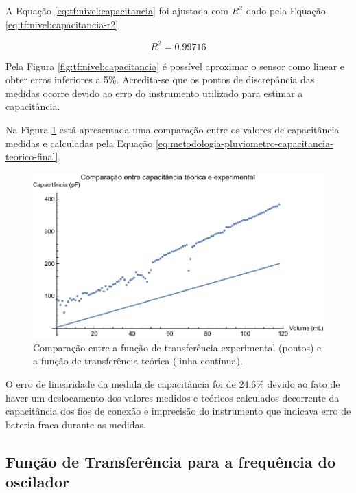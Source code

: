 \documentclass[a4paper]{instrumentacao}
\begin{document}
A Equação \ref{eq:tf:nivel:capacitancia} foi ajustada com $R^2$ dado pela Equação \ref{eq:tf:nivel:capacitancia-r2} 

\begin{equation}
	R^2 = 0.99716
	\label{eq:tf:nivel:capacitancia-r2}
\end{equation}

Pela Figura \ref{fig:tf:nivel:capacitancia} é possível aproximar o sensor como linear e obter erros inferiores a 5\%. Acredita-se que os pontos de discrepância das medidas ocorre devido ao erro do instrumento utilizado para estimar a capacitância.

Na Figura \ref{fig:resultados-pluviometro-capacitancia-comparacao} está apresentada uma comparação entre os valores de capacitância medidas e calculadas pela Equação \ref{eq:metodologia-pluviometro-capacitancia-teorico-final}.

\begin{figure}[H]
	\centering \includegraphics[width=\textwidth]{Nivel/Experimental/Capacitancia-Comparacao.pdf}
	\caption{Comparação entre a função de transferência experimental (pontos) e a função de transferência teórica (linha contínua).}
	\label{fig:resultados-pluviometro-capacitancia-comparacao}
\end{figure}

O erro de linearidade da medida de capacitância foi de 24.6\% devido ao fato de haver um deslocamento dos valores medidos e teóricos calculados decorrente da capacitância dos fios de conexão e imprecisão do instrumento que indicava erro de bateria fraca durante as medidas.

\subsection{Função de Transferência para a frequência do oscilador}
\end{document}
